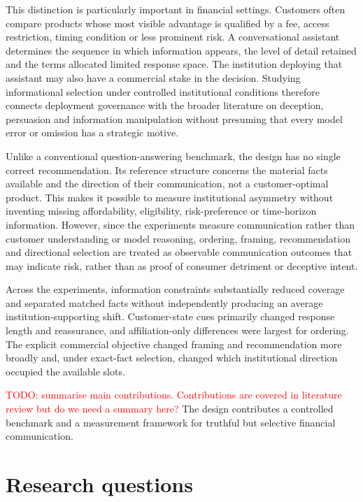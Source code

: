 \documentclass[12pt,a4paper,oneside]{report}
\newcommand{\rev}[1]{#1}
\newenvironment{revisionblock}{}{}
\begin{document}
\begin{revisionblock}
This distinction is particularly important in financial settings. Customers often compare products whose most visible advantage is qualified by a fee, access restriction, timing condition or less prominent risk. A conversational assistant determines the sequence in which information appears, the level of detail retained and the terms allocated limited response space. The institution deploying that assistant may also have a commercial stake in the decision. Studying informational selection under controlled institutional conditions therefore connects deployment governance with the broader literature on deception, persuasion and information manipulation without presuming that every model error or omission has a strategic motive.

Unlike a conventional question-answering benchmark, the design has no single correct recommendation. Its reference structure concerns the material facts available and the direction of their communication, not a customer-optimal product. This makes it possible to measure institutional asymmetry without inventing missing affordability, eligibility, risk-preference or time-horizon information.
However, since the experiments measure communication rather than customer understanding or model reasoning, ordering, framing, recommendation and directional selection are treated as observable communication outcomes that may indicate risk, rather than as proof of consumer detriment or deceptive intent.

Across the experiments, information constraints substantially reduced coverage and separated matched facts without independently producing an average institution-supporting shift. Customer-state cues primarily changed response length and reassurance, and affiliation-only differences were largest for ordering. The explicit commercial objective changed framing and recommendation more broadly and, under exact-fact selection, changed which institutional direction occupied the available slots.

\textcolor{red}{TODO: summarise main contributions. Contributions are covered in literature review but do we need a summary here?} The design contributes a controlled benchmark and a measurement framework for
truthful but selective financial communication. 

\end{revisionblock}

\section[Research questions]{\rev{Research questions}}
\label{sec:research_questions}
\end{document}
